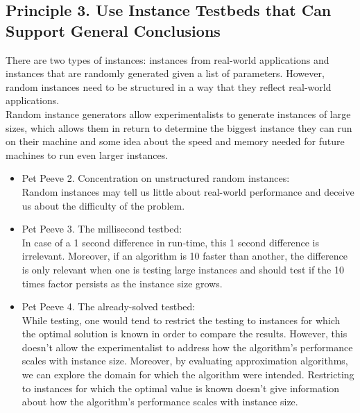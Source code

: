 \documentclass[]{scrartcl}
\begin{document}
\subsection*{Principle 3. Use Instance Testbeds that Can Support General Conclusions}
There are two types of instances: instances from real-world applications and instances that are randomly generated given a list of parameters. However, random instances need to be structured in a way that they reflect real-world applications. \\ Random instance generators allow experimentalists to generate instances of large sizes, which allows them in return to determine the biggest instance they can run on their machine and some idea about the speed and memory needed for future machines to run even larger instances.
\begin{itemize}
	\item Pet Peeve 2. Concentration on unstructured random instances: \\
	Random instances may tell us little about real-world performance and deceive us about the difficulty of the problem. 
\end{itemize}
\begin{itemize}
	\item Pet Peeve 3. The millisecond testbed: \\
	In case of a 1 second difference in run-time, this 1 second difference is irrelevant. Moreover, if an algorithm is 10 faster than another, the difference is only relevant when one is testing large instances and should test if the 10 times factor persists as the instance size grows.
\end{itemize}
\begin{itemize}
	\item Pet Peeve 4. The already-solved testbed: \\
	While testing, one would tend to restrict the testing to instances for which the optimal solution is known in order to compare the results. However, this doesn't allow the experimentalist to address how the algorithm's performance scales with instance size. Moreover, by evaluating approximation algorithms, we can explore the domain for which the algorithm were intended. Restricting to instances for which the optimal value is known doesn't give information about how the algorithm's performance scales with instance size. 
\end{itemize}
\end{document}
